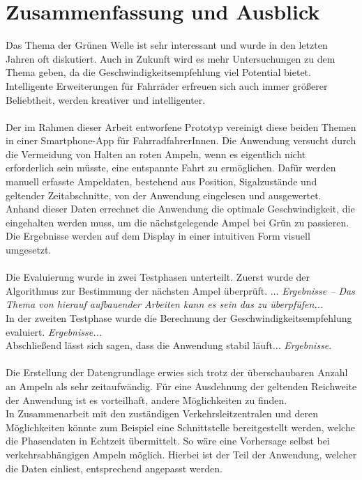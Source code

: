 \chapter{\label{chap:fazit}Zusammenfassung und Ausblick}
Das Thema der Grünen Welle ist sehr interessant und wurde in den letzten Jahren oft diskutiert. Auch in Zukunft wird es mehr Untersuchungen zu dem Thema geben, da die Geschwindigkeitsempfehlung viel Potential bietet. Intelligente Erweiterungen für Fahrräder erfreuen sich auch immer größerer Beliebtheit, werden kreativer und intelligenter.\\\\
Der im Rahmen dieser Arbeit entworfene Prototyp vereinigt diese beiden Themen in einer \gls{Smartphone}-\gls{App} für FahrradfahrerInnen. Die Anwendung versucht durch die Vermeidung von Halten an roten Ampeln, wenn es eigentlich nicht erforderlich sein müsste, eine entspannte Fahrt zu ermöglichen. Dafür werden manuell erfasste Ampeldaten, bestehend aus Position, Sigalzustände und geltender Zeitabschnitte, von der Anwendung eingelesen und ausgewertet. Anhand dieser Daten errechnet die Anwendung die optimale Geschwindigkeit, die eingehalten werden muss, um die nächstgelegende Ampel bei Grün zu passieren. Die Ergebnisse werden auf dem Display in einer intuitiven Form visuell umgesetzt.\\\\ 
Die Evaluierung wurde in zwei Testphasen unterteilt. Zuerst wurde der Algorithmus zur Bestimmung der nächsten Ampel überprüft. ... \textit{Ergebnisse -- Das Thema von hierauf aufbauender Arbeiten kann es sein das zu überpfüfen...}\\
In der zweiten Testphase wurde die Berechnung der Geschwindigkeitsempfehlung evaluiert. \textit{Ergebnisse...}\\
Abschließend lässt sich sagen, dass die Anwendung stabil läuft... \textit{Ergebnisse}.\\\\
%
%
Die Erstellung der Datengrundlage erwies sich trotz der überschaubaren Anzahl an Ampeln als sehr zeitaufwändig. Für eine Ausdehnung der geltenden Reichweite der Anwendung ist es vorteilhaft, andere Möglichkeiten zu finden.\\ 
In Zusammenarbeit mit den zuständigen Verkehrsleitzentralen und deren Möglichkeiten könnte zum Beispiel eine Schnittstelle bereitgestellt werden, welche die Phasendaten in Echtzeit übermittelt. So wäre eine Vorhersage selbst bei verkehrsabhängigen Ampeln möglich. Hierbei ist der Teil der Anwendung, welcher die Daten einliest, entsprechend angepasst werden.\\
